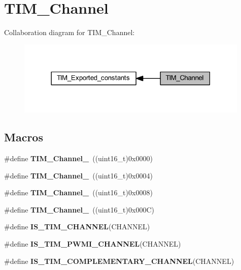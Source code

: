 \hypertarget{group___t_i_m___channel}{}\section{T\+I\+M\+\_\+\+Channel}
\label{group___t_i_m___channel}
Collaboration diagram for T\+I\+M\+\_\+\+Channel\+:\nopagebreak
\begin{figure}[H]
\begin{center}
\leavevmode
\includegraphics[width=314pt]{group___t_i_m___channel}
\end{center}
\end{figure}
\subsection*{Macros}
\begin{DoxyCompactItemize}
\item 
\mbox{\label{group___t_i_m___channel_ga69ea7f558f02c63dd1082d784d2449bd}} 
\#define {\bfseries T\+I\+M\+\_\+\+Channel\+\_}~((uint16\+\_\+t)0x0000)
\item 
\mbox{\label{group___t_i_m___channel_ga03d7da8269a87a560f68985b4bd80931}} 
\#define {\bfseries T\+I\+M\+\_\+\+Channel\+\_}~((uint16\+\_\+t)0x0004)
\item 
\mbox{\label{group___t_i_m___channel_ga012711b19e8c91f6f352801a3dc0bcc9}} 
\#define {\bfseries T\+I\+M\+\_\+\+Channel\+\_}~((uint16\+\_\+t)0x0008)
\item 
\mbox{\label{group___t_i_m___channel_ga7414888c40d066af235bc1f80b99bd9d}} 
\#define {\bfseries T\+I\+M\+\_\+\+Channel\+\_}~((uint16\+\_\+t)0x000\+C)
\item 
\#define {\bfseries I\+S\+\_\+\+T\+I\+M\+\_\+\+C\+H\+A\+N\+N\+EL}(C\+H\+A\+N\+N\+EL)
\item 
\#define {\bfseries I\+S\+\_\+\+T\+I\+M\+\_\+\+P\+W\+M\+I\+\_\+\+C\+H\+A\+N\+N\+EL}(C\+H\+A\+N\+N\+EL)
\item 
\#define {\bfseries I\+S\+\_\+\+T\+I\+M\+\_\+\+C\+O\+M\+P\+L\+E\+M\+E\+N\+T\+A\+R\+Y\+\_\+\+C\+H\+A\+N\+N\+EL}(C\+H\+A\+N\+N\+EL)
\end{DoxyCompactItemize}


